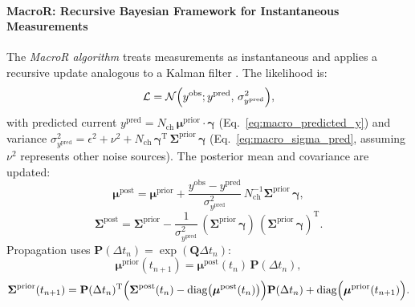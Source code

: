 \documentclass[pdflatex,sn-nature]{sn-jnl}%
\begin{document}
\paragraph{MacroR: Recursive Bayesian Framework for Instantaneous Measurements}
The \textit{MacroR algorithm} \cite{Moffatt} treats measurements as instantaneous and applies a recursive update analogous to a Kalman filter \cite{stepanyuk2011efficient}. The likelihood is:
\begin{equation}
\mathcal{L} = \mathcal{N}\Bigl( y^{\text{obs}} ; y^{\text{pred}},\, \sigma^2_{y^{\text{pred}}} \Bigr),
\label{eq:macro_likelihood}
\end{equation}
with predicted current \( y^{\text{pred}} = N_{\text{ch}}\, \boldsymbol{\mu}^{\text{prior}} \cdot \boldsymbol{\gamma} \) (Eq.~\ref{eq:macro_predicted_y}) and variance \( \sigma^2_{y^{\text{pred}}} = \epsilon^2 + \nu^2 + N_{\text{ch}}\, \boldsymbol{\gamma}^{\mathrm{T}}\, \boldsymbol{\Sigma}^{\text{prior}}\, \boldsymbol{\gamma} \) (Eq.~\ref{eq:macro_sigma_pred}, assuming \(\nu^2\) represents other noise sources). The posterior mean and covariance are updated:
\begin{equation}
\boldsymbol{\mu}^{\text{post}} = \boldsymbol{\mu}^{\text{prior}} + \frac{y^{\text{obs}} - y^{\text{pred}}}{\sigma^2_{y^{\text{pred}}}}\, N_{\text{ch}}^{-1} \boldsymbol{\Sigma}^{\text{prior}}\, \boldsymbol{\gamma},
\label{eq:macro_mean_posterior} %
\end{equation}
\begin{equation}
    \boldsymbol{\Sigma}^{\text{post}} = \boldsymbol{\Sigma}^{\text{prior}} - \frac{1}{\sigma^2_{y^{\text{pred}}}}\, (\boldsymbol{\Sigma}^{\text{prior}}\, \boldsymbol{\gamma})\, (\boldsymbol{\Sigma}^{\text{prior}}\, \boldsymbol{\gamma})^{\mathrm{T}}.
\label{eq:macro_cov_posterior} %
\end{equation}
Propagation uses \(\mathbf{P}(\Delta t_n) = \exp(\boldsymbol{Q}\Delta t_n)\):
\begin{equation}
\boldsymbol{\mu}^{\text{prior}}(t_{n+1}) = \boldsymbol{\mu}^{\text{post}}(t_n)\, \mathbf{P}(\Delta t_n),
    \label{eq:macro_mean_next_prior}
\end{equation}
\begin{equation}
\boldsymbol{\Sigma}^{\text{prior}}(t_{n+1}) = \mathbf{P}(\Delta t_n)^{\mathrm{T}} \Bigl( \boldsymbol{\Sigma}^{\text{post}}(t_n) - \mathrm{diag}\bigl(\boldsymbol{\mu}^{\text{post}}(t_n)\bigr) \Bigr) \mathbf{P}(\Delta t_n) + \mathrm{diag}\Bigl(\boldsymbol{\mu}^{\text{prior}}(t_{n+1})\Bigr).
\label{eq:macro_mean_next_cov} %
\end{equation}
\end{document}
